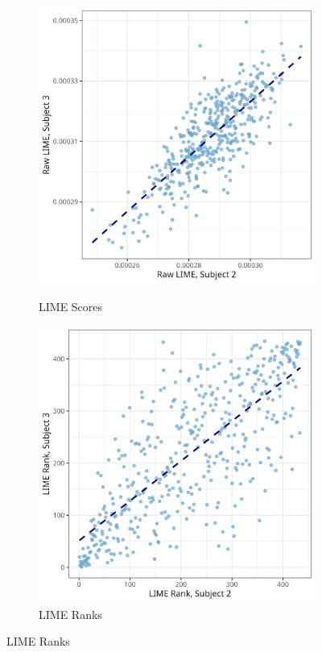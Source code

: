 \documentclass[10pt,letterpaper]{article}
\begin{document}
\begin{figure}[ht]
\begin{subfigure}[t]{0.22\textwidth}
        \label{subfig:scatter_laws_shap_rank}
    \end{subfigure}
    \hfill
    \begin{subfigure}[t]{0.22\textwidth}
        \centering
        \caption{LIME Scores}
        \includegraphics[width=\textwidth]{figs/scatter_laws_lime_raw.png}
        \label{subfig:scatter_laws_lime_raw}
    \end{subfigure}
    \hfill
    \begin{subfigure}[t]{0.22\textwidth}
        \centering
        \caption{LIME Ranks}
        \includegraphics[width=\textwidth]{figs/scatter_laws_lime_rank.png}

\end{subfigure}
\end{figure}
\end{document}

